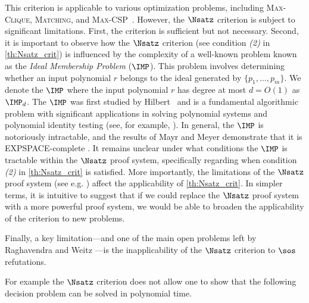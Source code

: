 \documentclass[11pt]{article}
\begin{document}
This criterion is applicable to various optimization problems, including \textsc{Max-Clique}, \textsc{Matching}, and \textsc{Max-CSP}~\cite{raghavendra_weitz2017}. 
%
However, the \(\Nsatz\) criterion is subject to significant limitations. First, the criterion is sufficient but not necessary.
Second, it is important to observe how the $\Nsatz$ criterion (see condition \textit{(2)} in \cref{th:Nsatz_crit}) is influenced by the complexity of a well-known problem known as the \emph{Ideal Membership Problem} (\(\IMP\)). This problem involves determining whether an input polynomial \(r\) belongs to the ideal generated by \(\{p_1, \ldots, p_m\}\). We denote the \(\IMP\) where the input polynomial \(r\) has degree at most \(d=O(1)\) as \(\IMP_d\). The \(\IMP\) was first studied by Hilbert~\cite{Hilbert1893} and is a fundamental algorithmic problem with significant applications in solving polynomial systems and polynomial identity testing (see, for example, \cite{Cox}). In general, the \(\IMP\) is notoriously intractable, and the results of Mayr and Meyer demonstrate that it is EXPSPACE-complete \cite{Mayr1989, MAYR1982305}.
It remains unclear under what conditions the \(\IMP\) is tractable within the \(\Nsatz\) proof system, specifically regarding when condition \textit{(2)} in \cref{th:Nsatz_crit} is satisfied. More importantly, the limitations of the \(\Nsatz\) proof system (see e.g. \cite{FlemingKothariPitassi19}) affect the applicability of \cref{th:Nsatz_crit}. 
In simpler terms, it is intuitive to suggest that if we could replace the \(\Nsatz\) proof system with a more powerful proof system, we would be able to broaden the applicability of the criterion to new problems.
%

Finally, a key limitation—and one of the main open problems left by Raghavendra and Weitz \cite{raghavendra_weitz2017, Weitz:Phd}—is the inapplicability of the $\Nsatz$ criterion to \(\sos\) refutations.
%

For example the $\Nsatz$ criterion does not allow one to show that the following decision problem can be solved in polynomial time. 
\end{document}
